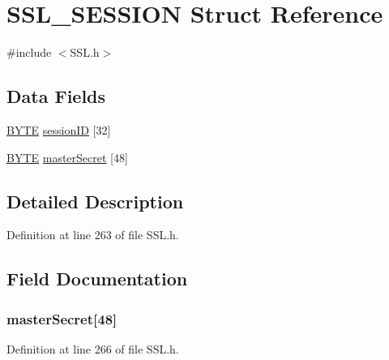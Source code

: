 \hypertarget{struct_s_s_l___s_e_s_s_i_o_n}{}\section{S\+S\+L\+\_\+\+S\+E\+S\+S\+I\+O\+N Struct Reference}
\label{struct_s_s_l___s_e_s_s_i_o_n}


{\ttfamily \#include $<$S\+S\+L.\+h$>$}

\subsection*{Data Fields}
\begin{DoxyCompactItemize}
\item 
\hyperlink{_generic_type_defs_8h_a4ae1dab0fb4b072a66584546209e7d58}{B\+Y\+T\+E} \hyperlink{struct_s_s_l___s_e_s_s_i_o_n_af0841a9ec57cfe5a2d16970638d00b42}{session\+I\+D} \mbox{[}32\mbox{]}
\item 
\hyperlink{_generic_type_defs_8h_a4ae1dab0fb4b072a66584546209e7d58}{B\+Y\+T\+E} \hyperlink{struct_s_s_l___s_e_s_s_i_o_n_ab85af3750e2ff803076e1f7fbe82c8b0}{master\+Secret} \mbox{[}48\mbox{]}
\end{DoxyCompactItemize}


\subsection{Detailed Description}


Definition at line 263 of file S\+S\+L.\+h.



\subsection{Field Documentation}
\hypertarget{struct_s_s_l___s_e_s_s_i_o_n_ab85af3750e2ff803076e1f7fbe82c8b0}{}
\subsubsection[{master\+Secret}]{ master\+Secret\mbox{[}48\mbox{]}}\label{struct_s_s_l___s_e_s_s_i_o_n_ab85af3750e2ff803076e1f7fbe82c8b0}


Definition at line 266 of file S\+S\+L.\+h.

